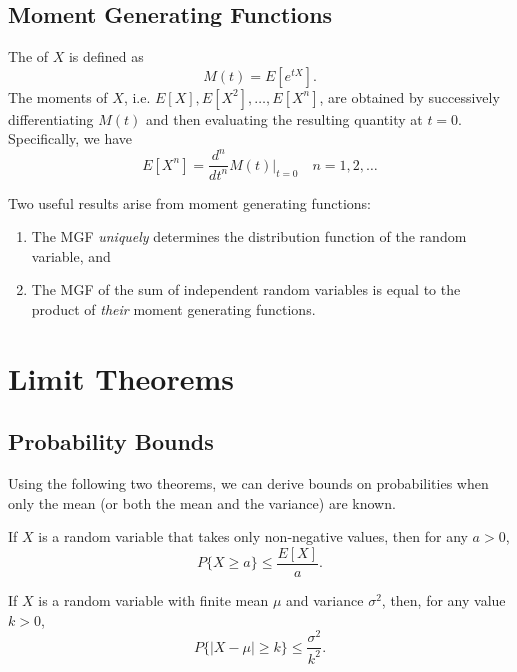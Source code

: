 \documentclass{article}
\begin{document}
\subsection{Moment Generating Functions}
\begin{definition}
    The  of $X$ is defined as 
    \[M(t)=E[e^{tX}].\]The moments of $X$, i.e. $E[X],E[X^{2}],\dotsc,E[X^{n}]$, are obtained by successively differentiating $M(t)$ and then evaluating the resulting quantity at $t=0$. Specifically, we have 
    \[E[X^{n}]=\frac{d^{n}}{dt^{n}}M(t)\bigg\rvert_{t=0}\quad n=1,2,\dotsc\]
\end{definition}
\begin{remark}
    Two useful results arise from moment generating functions:
    \begin{enumerate}
        \item The MGF \textit{uniquely} determines the distribution function of the random variable, and
        \item The MGF of the sum of independent random variables is equal to the product of \textit{their} moment generating functions.
    \end{enumerate}
\end{remark}
\section{Limit Theorems}
\subsection{Probability Bounds}
Using the following two theorems, we can derive bounds on probabilities when only the mean (or both the mean and the variance) are known.
\begin{theorem}
    If $X$ is a random variable that takes only non-negative values, then for any $a>0$,
    \[P\{X\geq a\}\leq \frac{E[X]}{a}.\]
\end{theorem}
\begin{theorem}
    If $X$ is a random variable with finite mean $\mu$ and variance $\sigma^{2}$, then, for any value $k>0$,
    \[P\{|X-\mu|\geq k\}\leq \frac{\sigma^{2}}{k^{2}}.\]
\end{theorem}
\end{document}
